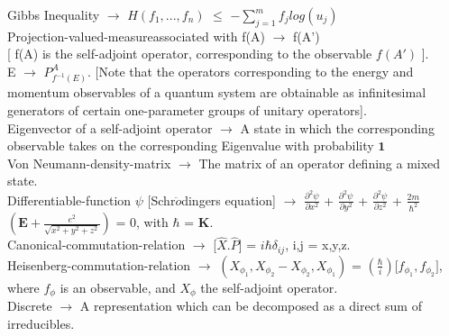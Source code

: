 \documentclass[10pt,fancy]{elegantbook}
\begin{document}
{\begin{definition}
Gibbs Inequality $\longrightarrow$ $H(f_1,...,f_n)$ $\leq$ ${- \sum_{j=1}^{m} f_j log(u_j)}$ \\
 
Projection-valued-measureassociated with f(A) $\longrightarrow$ f(A')  \\
  
[ f(A) is the self-adjoint operator, corresponding to the observable $f(A')$ ]. \\ 
E $\rightarrow$ $P^{A}_{f^{-1}(E)}$. [Note that the operators corresponding to the energy and momentum observables of a                                          
quantum system are obtainable as infinitesimal generators of certain one-parameter groups of unitary operators]. \\
                                                                        
Eigenvector of a self-adjoint operator $\longrightarrow$ A state in which the corresponding observable takes
on the corresponding Eigenvalue with probability $\mathbf 1$ \\
 
Von Neumann-density-matrix $\longrightarrow$ The matrix of an operator defining a mixed state.  \\
  
Differentiable-function $\psi$ [Schr$\ddot{o}$dingers equation] $\longrightarrow$ $\frac{\partial^2 \psi}{\partial x^2}$ + $\frac{\partial^2 \psi}{\partial y^2}$ + $\frac{\partial^2 \psi}{\partial z^2}$ + $\frac{2m}{\hbar^2}$ $\left(\mathbf E + \frac{e^2}{\sqrt{x^2 + y^2 + z^2}}\right)$ = 0, with $\hbar$ = $\mathbf K$.  \\

Canonical-commutation-relation $\longrightarrow$ [$\hat X. \hat P$] = $i \hbar \delta_{ij}$, i,j = x,y,z.  \\
  
Heisenberg-commutation-relation $\longrightarrow$ $(X_{\phi_1}, X_{\phi_2} - X_{\phi_2}, X_{\phi_1})$ = $(\frac{\hbar}{i})$[$f_{\phi_1}, f_{\phi_2}]$,
where $f_\phi$ is an observable, and $X_\phi$ the self-adjoint operator.  \\
  
Discrete $\longrightarrow$ A representation which can be decomposed as a direct sum of irreducibles. \\
  

\end{definition}}
\end{document}
